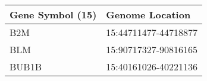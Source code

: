 \begin{tabular}{ll}
\toprule
Gene Symbol (15) &      Genome Location \\
\midrule
             B2M & 15:44711477-44718877 \\
             BLM & 15:90717327-90816165 \\
           BUB1B & 15:40161026-40221136 \\
\bottomrule
\end{tabular}
